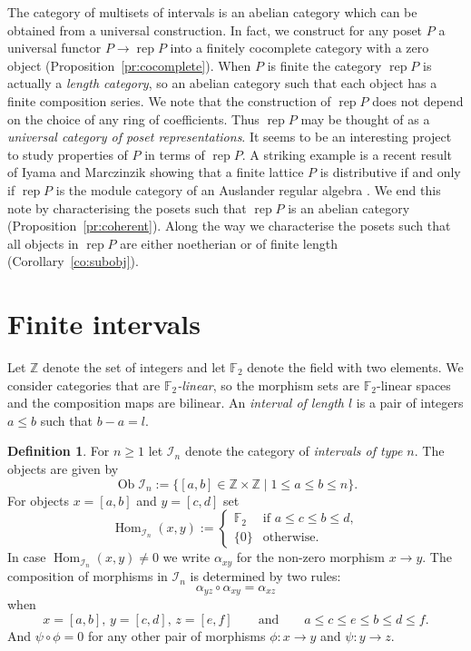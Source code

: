 \documentclass[a4paper]{amsart}
\theoremstyle{plain}
\theoremstyle{definition}
\newtheorem{defn}[thm]{Definition}
\theoremstyle{remark}
\numberwithin{equation}{section}
\newcommand{\Hom}{\operatorname{Hom}}
\newcommand{\Ob}{\operatorname{Ob}}
\newcommand{\rep}{\operatorname{rep}}
\def\I{\mathcal I}
\def\bbF{\mathbb F}
\def\bbZ{\mathbb Z}
\begin{document}
The category of multisets of intervals is an abelian category which
can be obtained from a universal construction.  In fact, we construct
for any poset $P$ a universal functor $P\to \rep P$ into a finitely
cocomplete category with a zero object
(Proposition~\ref{pr:cocomplete}).  When $P$ is finite the category
$\rep P$ is actually a \emph{length category}, so an abelian category
such that each object has a finite composition series.  We note that
the construction of $\rep P$ does not depend on the choice of any ring
of coefficients. Thus $\rep P$ may be thought of as a \emph{universal
  category of poset representations}.  It seems to be an interesting
project to study properties of $P$ in terms of $\rep P$.  A striking
example is a recent result of Iyama and Marczinzik showing that a
finite lattice $P$ is distributive if and only if $\rep P$ is the
module category of an Auslander regular algebra \cite{IM2022}. We end
this note by characterising the posets such that $\rep P$ is an
abelian category (Proposition~\ref{pr:coherent}). Along the way we
characterise the posets such that all objects in $\rep P$ are either
noetherian or of finite length (Corollary~\ref{co:subobj}).


\section{Finite intervals}

Let $\bbZ$ denote the set of integers and let $\bbF_2$ denote the field
with two elements. We consider categories that are
\emph{$\bbF_2$-linear}, so the morphism sets are $\bbF_2$-linear
spaces and the composition maps are bilinear.  An \emph{interval of
  length $l$} is a pair of integers $a\le b$ such that $b-a=l$.

\begin{defn}
  For $n\ge 1$ let $\I_n$ denote the category of \emph{intervals
    of type $n$}. The objects are given by
\[\Ob\I_n:=\{[a,b]\in\bbZ\times\bbZ \mid 1\le a\le b\le n\}.\] For objects
$x=[a,b]$ and $y=[c,d]$ set
\[\Hom_{\I_n}(x,y):=\begin{cases} \bbF_2&\text{if }a\le c\le b\le d,\\
    \{0\}& \text{otherwise}.
\end{cases}\]
In case $\Hom_{\I_n}(x,y)\neq 0$  we write $\alpha_{xy}$ for the non-zero morphism
$x\to y$. The composition of morphisms in $\I_n$ is determined by two
rules:
\[\alpha_{yz}\circ\alpha_{xy}=\alpha_{xz}\]  when
\[x=[a,b],\, y=[c,d],\, z=[e,f]\qquad\text{and}\qquad a\le c\le e\le
  b\le d\le f.\] And $\psi\circ\phi=0$ for any other pair of morphisms
$\phi\colon x\to y$ and $\psi\colon y\to z$.
\end{defn}
\end{document}
